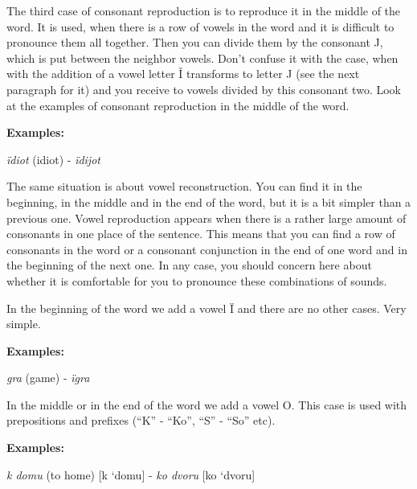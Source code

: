 The third case of consonant reproduction is to reproduce it in the middle of the word. It is used, when there is a row of vowels in the word and it is difficult to pronounce them all together. Then you can divide them by the consonant J, which is put between the neighbor vowels. Don’t confuse it with the case, when with the addition of a vowel letter Ǐ transforms to letter J (see the next paragraph for it) and you receive to vowels divided by this consonant two. Look at the examples of consonant reproduction in the middle of the word.

\textbf{Examples:}

\textit{ïdiot} (idiot) \textipa{[idI’ot]} - \textit{ïdijot} 

The same situation is about vowel reconstruction. You can find it in the beginning, in the middle and in the end of the word, but it is a bit simpler than a previous one. Vowel reproduction appears when there is a rather large amount of consonants in one place of the sentence. This means that you can find a row of consonants in the word or a consonant conjunction in the end of one word and in the beginning of the next one. In any case, you should concern here about whether it is comfortable for you to pronounce these combinations of sounds.

In the beginning of the word we add a vowel Ï and there are no other cases. Very simple.

\textbf{Examples:}

\textit{gra} (game) \textipa{[Hra]} - \textit{ïgra} \textipa{[i’Hra]}

In the middle or in the end of the word we add a vowel O. This case is used with prepositions and prefixes (“K” - “Ko”, “S” - “So” etc). 

\textbf{Examples:}

\textit{k domu} (to home) [k ‘domu] - \textit{ko dvoru} [ko ‘dvoru]




